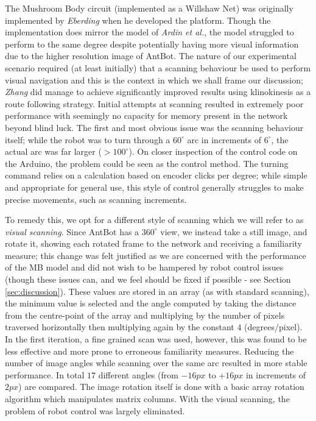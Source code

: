 \documentclass[a4paper,11pt,twoside,openright]{article}
\begin{document}
The Mushroom Body circuit (implemented as a Willshaw Net) was originally implemented by \textit{Eberding} when he
developed the platform. Though the implementation does mirror the model of \textit{Ardin et al.}, the model
struggled to perform to the same degree despite potentially having more visual information due to the higher resolution
image of AntBot. The nature of our experimental scenario required (at least initially) that a scanning behaviour be used
to perform visual navigation and this is the context in which we shall frame our discussion; \textit{Zhang}
did manage to achieve significantly improved results using klinokinesis as a route following strategy. Initial attempts
at scanning resulted in extremely poor performance with seemingly no capacity for memory present in the network beyond
blind luck. The first and most obvious issue was the scanning behaviour itself; while the robot was to turn through a
$60^{\circ}$ arc in increments of $6^{\circ}$, the actual arc was far larger ($> 100^{\circ}$). On closer inspection of the
control code on the Arduino, the problem could be seen as the control method. The turning command relies on a calculation
based on encoder clicks per degree; while simple and appropriate for general use, this style of control generally struggles
to make precise movements, such as scanning increments.
\newline

To remedy this, we opt for a different style of scanning which
we will refer to as \textit{visual scanning}. Since AntBot has a $360^{\circ}$ view, we instead take a still image, and rotate
it, showing each rotated frame to the network and receiving a familiarity measure; this change was felt justified as we are
concerned with the performance of the MB model and did not wish to be hampered by robot control issues (though these issues
can, and we feel should be fixed if possible - see Section \ref{sec:discussion}). These values are stored in an array (as
with standard scanning), the minimum value is selected and the angle computed by taking the distance from the centre-point
of the array and multiplying by the number of pixels traversed horizontally then multiplying again by the constant $4$ (degrees/pixel).
In the first iteration, a fine grained scan was used, however, this was found to be less effective and more prone to erroneous
familiarity measures. Reducing the number of image angles while scanning over the same arc resulted in more stable performance. In total
$17$ different angles (from $-16px$ to $+16px$ in increments of $2px$) are compared. The image rotation itself is done with
a basic array rotation algorithm which manipulates matrix columns. With the visual scanning, the problem of robot
control was largely eliminated. 
\newline
\end{document}
